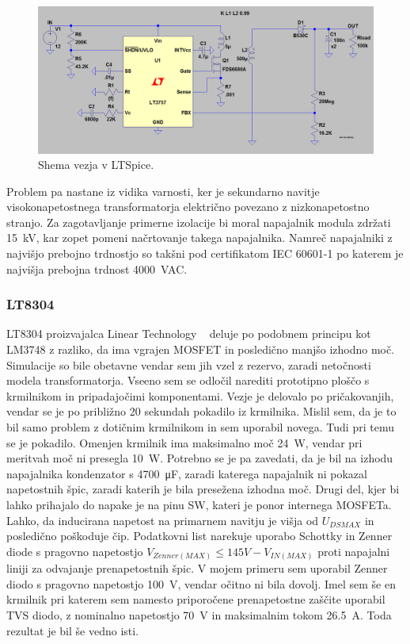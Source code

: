 \documentclass[a4paper,twoside,openright,12pt,Slovene]{book}
\begin{document}
    \begin{figure}[H]
        \centering
        \includegraphics[width=1\columnwidth]{Slike/Simulacije/LM3757spice.png}
        \caption{\label{LM3757spice} Shema vezja v LTSpice.}
    \end{figure}
    
Problem pa nastane iz vidika varnosti, ker je sekundarno navitje visokonapetostnega transformatorja električno povezano z nizkonapetostno stranjo. Za zagotavljanje primerne izolacije bi moral napajalnik modula zdržati \SI{15}{\kilo\volt}, kar zopet pomeni načrtovanje takega napajalnika. Namreč napajalniki z najvišjo prebojno trdnostjo so takšni pod certifikatom IEC 60601-1 po katerem je najvišja prebojna trdnost \SI{4000}{\volt}AC.

	\subsubsection{LT8304} \label{LT8304}
LT8304 proizvajalca Linear Technology ~\cite{analog:LT8304} deluje po podobnem principu kot LM3748 z razliko, da ima vgrajen MOSFET in posledično manjšo izhodno moč. Simulacije so bile obetavne vendar sem jih vzel z rezervo, zaradi netočnosti modela transformatorja. Vseeno sem se odločil narediti prototipno ploščo s krmilnikom in pripadajočimi komponentami. Vezje je delovalo po pričakovanjih, vendar se je po približno 20 sekundah pokadilo iz krmilnika. Mislil sem, da je to bil samo problem z dotičnim krmilnikom in sem uporabil novega. Tudi pri temu se je pokadilo. Omenjen krmilnik ima maksimalno moč \SI{24}{\watt}, vendar pri meritvah moč ni presegla \SI{10}{\watt}. Potrebno se je pa zavedati, da je bil na izhodu napajalnika kondenzator s \SI{4700}{\micro\farad}, zaradi katerega napajalnik ni pokazal napetostnih špic, zaradi katerih je bila presežena izhodna moč. Drugi del, kjer bi lahko prihajalo do napake je na pinu SW, kateri je ponor internega MOSFETa. Lahko, da inducirana napetost na primarnem navitju je višja od \(U_{DS MAX}\) in posledično poškoduje čip. Podatkovni list narekuje uporabo Schottky in Zenner diode s pragovno napetostjo \(V_{Zenner(MAX)} \leq 145 V - V_{IN(MAX)}\) proti napajalni liniji za odvajanje prenapetostnih špic. V mojem primeru sem uporabil Zenner diodo s pragovno napetostjo \SI{100}{\volt}, vendar očitno ni bila dovolj. Imel sem še en krmilnik pri katerem sem namesto priporočene prenapetostne zaščite uporabil TVS diodo, z nominalno napetostjo \SI{70}{\volt} in maksimalnim tokom \SI{26.5}{\ampere}. Toda rezultat je bil še vedno isti.
\end{document}
